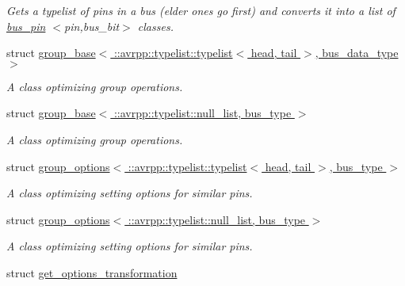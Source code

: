\begin{DoxyCompactItemize}
\begin{DoxyCompactList}\small\item\em Gets a typelist of pins in a bus (elder ones go first) and converts it into a list of \hyperlink{structavrpp_1_1bus_1_1bus__pin}{bus\_\-pin} $<$pin,bus\_\-bit$>$ classes. \item\end{DoxyCompactList}\item 
struct \hyperlink{structavrpp_1_1bus_1_1group__base_3_01_1_1avrpp_1_1typelist_1_1typelist_3_01head_00_01tail_01_4_00_01bus__data__type_01_4}{group\_\-base$<$ ::avrpp::typelist::typelist$<$ head, tail $>$, bus\_\-data\_\-type $>$}
\begin{DoxyCompactList}\small\item\em A class optimizing group operations. \item\end{DoxyCompactList}\item 
struct \hyperlink{structavrpp_1_1bus_1_1group__base_3_01_1_1avrpp_1_1typelist_1_1null__list_00_01bus__type_01_4}{group\_\-base$<$ ::avrpp::typelist::null\_\-list, bus\_\-type $>$}
\begin{DoxyCompactList}\small\item\em A class optimizing group operations. \item\end{DoxyCompactList}\item 
struct \hyperlink{structavrpp_1_1bus_1_1group__options_3_01_1_1avrpp_1_1typelist_1_1typelist_3_01head_00_01tail_01_4_00_01bus__type_01_4}{group\_\-options$<$ ::avrpp::typelist::typelist$<$ head, tail $>$, bus\_\-type $>$}
\begin{DoxyCompactList}\small\item\em A class optimizing setting options for similar pins. \item\end{DoxyCompactList}\item 
struct \hyperlink{structavrpp_1_1bus_1_1group__options_3_01_1_1avrpp_1_1typelist_1_1null__list_00_01bus__type_01_4}{group\_\-options$<$ ::avrpp::typelist::null\_\-list, bus\_\-type $>$}
\begin{DoxyCompactList}\small\item\em A class optimizing setting options for similar pins. \item\end{DoxyCompactList}\item 
struct \hyperlink{structavrpp_1_1bus_1_1get__options__transformation}{get\_\-options\_\-transformation}

\end{DoxyCompactItemize}
